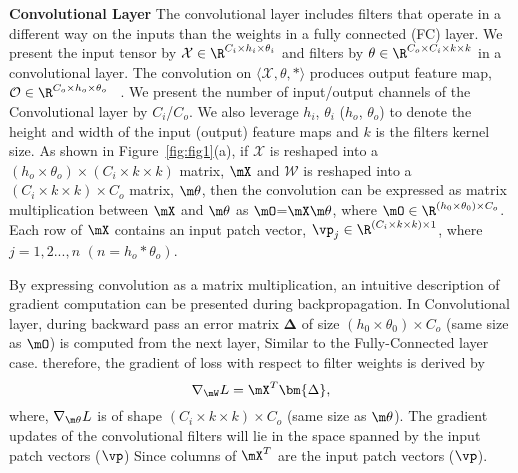 \textbf{Convolutional Layer}
The convolutional layer includes filters that operate in a different way on the inputs than the weights in a fully connected (FC) layer. We present the input tensor by $\mathcal{X} \in \R^{C_i \times h_i \times \theta_i}$ and filters by $\mathcal{\theta} \in \R^{C_o \times C_i \times k \times k}$ in a convolutional layer. The convolution on $\langle \mathcal{X},\mathcal{\theta},*\rangle$ produces output feature map, $\mathcal{O} \in \R^{C_o \times h_o \times \theta_o}$ ~\citep{conv_op}. We present the number of input/output channels of the Convolutional layer by $C_i$/$C_o$. We also leverage $h_i$, $\theta_i$ ($h_o$, $\theta_o$) to denote the height and width of the input (output) feature maps and $k$ is the filters kernel size. As shown in Figure~\ref{fig:fig1}(a), if $\mathcal{X}$ is reshaped into a $(h_o \times \theta_o) \times (C_i\times k \times k)$ matrix, $\mX$ and $\mathcal{W}$ is reshaped into a $(C_i\times k \times k) \times C_o $ matrix, $\m\theta$, then the convolution can be expressed as matrix multiplication between $\mX$ and $\m\theta$ as $\mO$=$\mX\m\theta$, where $\mO \in \R^{(h_0\times \theta_0)\times C_o}$. Each row of $\mX$ contains an input patch vector, $\vp_j \in \R^{(C_i\times k \times k) \times 1}$, where $j=1,2...,n$ $(n=h_o*\theta_o)$.

By expressing convolution as a matrix multiplication, an intuitive description of gradient computation can be presented during backpropagation. In Convolutional layer, during backward pass an error matrix $\bm{\Delta}$ of size $(h_0\times \theta_0)\times C_o$ (same size as $\mO$) is computed from the next layer, Similar to the Fully-Connected layer case. therefore, the gradient of loss with respect to filter weights is derived by 
\begin{equation}
    \nabla_{\mW} L = \mX^T \bm{\Delta},  
\end{equation}
where, $\nabla_{\m\theta}L$ is of shape $(C_i\times k \times k) \times C_o $ (same size as $\m\theta$). The gradient updates of the convolutional filters will lie in the space spanned by the input patch vectors ($\vp$) Since columns of $\mX^T$ are the input patch vectors ($\vp$).